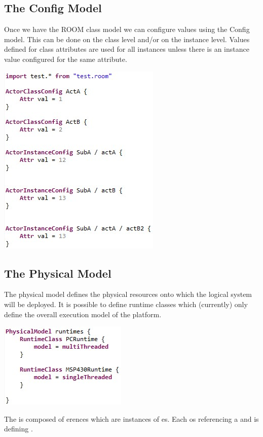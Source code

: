 \subsection{The Config Model}

Once we have the ROOM class model we can configure values using the Config model. This can be done on the 
class level and/or on the instance level. Values defined for class attributes are used for all instances 
unless there is an instance value configured for the same attribute.

\includegraphics{images/080-config.jpg}

\subsection{The Physical Model}

The physical model defines the physical resources onto which the logical system will be deployed. It is 
possible to define runtime classes which (currently) only define the overall execution model of the 
platform.

\includegraphics{images/080-runtimes.jpg}

The  is composed of erences which are instances
of es. Each  os referencing a 
 and is defining .

